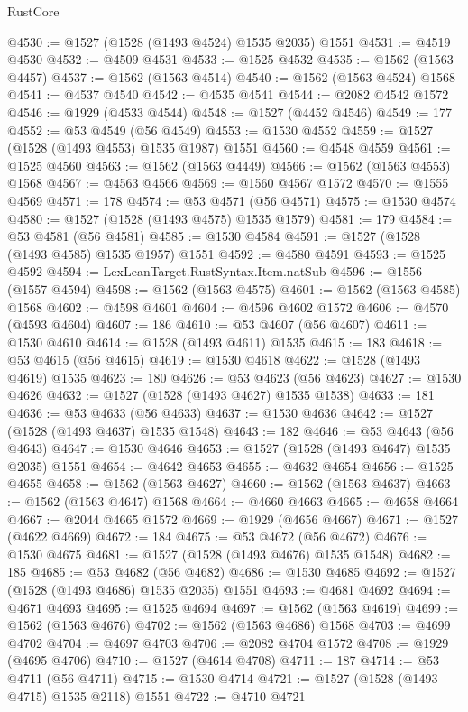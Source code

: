 \begin{lexlean}{RustCore}
\begin{coremodule}
@4530 := @1527 (@1528 (@1493 @4524) @1535 @2035) @1551
@4531 := @4519 @4530
@4532 := @4509 @4531
@4533 := @1525 @4532
@4535 := @1562 (@1563 @4457)
@4537 := @1562 (@1563 @4514)
@4540 := @1562 (@1563 @4524) @1568
@4541 := @4537 @4540
@4542 := @4535 @4541
@4544 := @2082 @4542 @1572
@4546 := @1929 (@4533 @4544)
@4548 := @1527 (@4452 @4546)
@4549 := 177
@4552 := @53 @4549 (@56 @4549)
@4553 := @1530 @4552
@4559 := @1527 (@1528 (@1493 @4553) @1535 @1987) @1551
@4560 := @4548 @4559
@4561 := @1525 @4560
@4563 := @1562 (@1563 @4449)
@4566 := @1562 (@1563 @4553) @1568
@4567 := @4563 @4566
@4569 := @1560 @4567 @1572
@4570 := @1555 @4569
@4571 := 178
@4574 := @53 @4571 (@56 @4571)
@4575 := @1530 @4574
@4580 := @1527 (@1528 (@1493 @4575) @1535 @1579)
@4581 := 179
@4584 := @53 @4581 (@56 @4581)
@4585 := @1530 @4584
@4591 := @1527 (@1528 (@1493 @4585) @1535 @1957) @1551
@4592 := @4580 @4591
@4593 := @1525 @4592
@4594 := LexLeanTarget.RustSyntax.Item.natSub
@4596 := @1556 (@1557 @4594)
@4598 := @1562 (@1563 @4575)
@4601 := @1562 (@1563 @4585) @1568
@4602 := @4598 @4601
@4604 := @4596 @4602 @1572
@4606 := @4570 (@4593 @4604)
@4607 := 186
@4610 := @53 @4607 (@56 @4607)
@4611 := @1530 @4610
@4614 := @1528 (@1493 @4611) @1535
@4615 := 183
@4618 := @53 @4615 (@56 @4615)
@4619 := @1530 @4618
@4622 := @1528 (@1493 @4619) @1535
@4623 := 180
@4626 := @53 @4623 (@56 @4623)
@4627 := @1530 @4626
@4632 := @1527 (@1528 (@1493 @4627) @1535 @1538)
@4633 := 181
@4636 := @53 @4633 (@56 @4633)
@4637 := @1530 @4636
@4642 := @1527 (@1528 (@1493 @4637) @1535 @1548)
@4643 := 182
@4646 := @53 @4643 (@56 @4643)
@4647 := @1530 @4646
@4653 := @1527 (@1528 (@1493 @4647) @1535 @2035) @1551
@4654 := @4642 @4653
@4655 := @4632 @4654
@4656 := @1525 @4655
@4658 := @1562 (@1563 @4627)
@4660 := @1562 (@1563 @4637)
@4663 := @1562 (@1563 @4647) @1568
@4664 := @4660 @4663
@4665 := @4658 @4664
@4667 := @2044 @4665 @1572
@4669 := @1929 (@4656 @4667)
@4671 := @1527 (@4622 @4669)
@4672 := 184
@4675 := @53 @4672 (@56 @4672)
@4676 := @1530 @4675
@4681 := @1527 (@1528 (@1493 @4676) @1535 @1548)
@4682 := 185
@4685 := @53 @4682 (@56 @4682)
@4686 := @1530 @4685
@4692 := @1527 (@1528 (@1493 @4686) @1535 @2035) @1551
@4693 := @4681 @4692
@4694 := @4671 @4693
@4695 := @1525 @4694
@4697 := @1562 (@1563 @4619)
@4699 := @1562 (@1563 @4676)
@4702 := @1562 (@1563 @4686) @1568
@4703 := @4699 @4702
@4704 := @4697 @4703
@4706 := @2082 @4704 @1572
@4708 := @1929 (@4695 @4706)
@4710 := @1527 (@4614 @4708)
@4711 := 187
@4714 := @53 @4711 (@56 @4711)
@4715 := @1530 @4714
@4721 := @1527 (@1528 (@1493 @4715) @1535 @2118) @1551
@4722 := @4710 @4721

\end{coremodule}
\end{lexlean}
